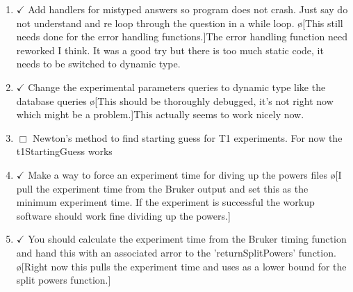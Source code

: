 \documentclass[10pt]{book}
\begin{document}
\begin{enumerate}
    \item $\checkmark$ Add handlers for mistyped answers so program does not crash. Just say do not understand and re loop through the question in a while loop. \o[This still needs done for the error handling functions.]{The error handling function need reworked I think. It was a good try but there is too much static code, it needs to be switched to dynamic type.}
    \item $\checkmark$ Change the experimental parameters queries to dynamic type like the database queries \o[This should be thoroughly debugged, it's not right now which might be a problem.]{This actually seems to work nicely now.}
    \item $\Box$ Newton's method to find starting guess for T1 experiments. For now the t1StartingGuess works 
    \item $\checkmark$ Make a way to force an experiment time for diving up the powers files \o[I pull the experiment time from the Bruker output and set this as the minimum experiment time. If the experiment is successful the workup software should work fine dividing up the powers.]{}
    \item $\checkmark$ You should calculate the experiment time from the Bruker timing function and hand this with an associated arror to the 'returnSplitPowers' function. \o[Right now this pulls the experiment time and uses as a lower bound for the split powers function.]{}
\end{enumerate}
\end{document}

